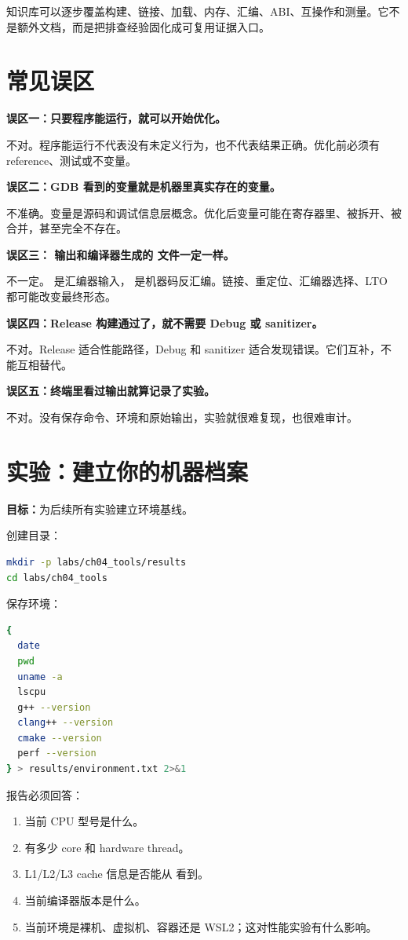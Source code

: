 知识库可以逐步覆盖构建、链接、加载、内存、汇编、ABI、互操作和测量。它不是额外文档，而是把排查经验固化成可复用证据入口。

\section{常见误区}

\begin{warningbox}
\textbf{误区一：只要程序能运行，就可以开始优化。}

不对。程序能运行不代表没有未定义行为，也不代表结果正确。优化前必须有 reference、测试或不变量。

\textbf{误区二：GDB 看到的变量就是机器里真实存在的变量。}

不准确。变量是源码和调试信息层概念。优化后变量可能在寄存器里、被拆开、被合并，甚至完全不存在。

\textbf{误区三： 输出和编译器生成的  文件一定一样。}

不一定。 是汇编器输入， 是机器码反汇编。链接、重定位、汇编器选择、LTO 都可能改变最终形态。

\textbf{误区四：Release 构建通过了，就不需要 Debug 或 sanitizer。}

不对。Release 适合性能路径，Debug 和 sanitizer 适合发现错误。它们互补，不能互相替代。

\textbf{误区五：终端里看过输出就算记录了实验。}

不对。没有保存命令、环境和原始输出，实验就很难复现，也很难审计。
\end{warningbox}

\section{实验：建立你的机器档案}

\begin{labbox}
\textbf{目标：}为后续所有实验建立环境基线。

创建目录：

\begin{lstlisting}[language=bash]
mkdir -p labs/ch04_tools/results
cd labs/ch04_tools
\end{lstlisting}

保存环境：

\begin{lstlisting}[language=bash]
{
  date
  pwd
  uname -a
  lscpu
  g++ --version
  clang++ --version
  cmake --version
  perf --version
} > results/environment.txt 2>&1
\end{lstlisting}

报告必须回答：

\begin{enumerate}
  \item 当前 CPU 型号是什么。
  \item 有多少 core 和 hardware thread。
  \item L1/L2/L3 cache 信息是否能从  看到。
  \item 当前编译器版本是什么。
  \item 当前环境是裸机、虚拟机、容器还是 WSL2；这对性能实验有什么影响。
\end{enumerate}
\end{labbox}

